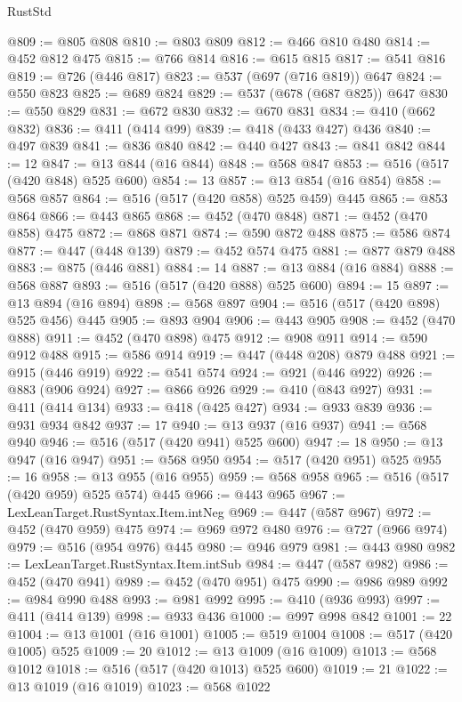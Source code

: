 \begin{lexlean}{RustStd}
\begin{coremodule}
@809 := @805 @808
@810 := @803 @809
@812 := @466 @810 @480
@814 := @452 @812 @475
@815 := @766 @814
@816 := @615 @815
@817 := @541 @816
@819 := @726 (@446 @817)
@823 := @537 (@697 (@716 @819)) @647
@824 := @550 @823
@825 := @689 @824
@829 := @537 (@678 (@687 @825)) @647
@830 := @550 @829
@831 := @672 @830
@832 := @670 @831
@834 := @410 (@662 @832)
@836 := @411 (@414 @99)
@839 := @418 (@433 @427) @436
@840 := @497 @839
@841 := @836 @840
@842 := @440 @427
@843 := @841 @842
@844 := 12
@847 := @13 @844 (@16 @844)
@848 := @568 @847
@853 := @516 (@517 (@420 @848) @525 @600)
@854 := 13
@857 := @13 @854 (@16 @854)
@858 := @568 @857
@864 := @516 (@517 (@420 @858) @525 @459) @445
@865 := @853 @864
@866 := @443 @865
@868 := @452 (@470 @848)
@871 := @452 (@470 @858) @475
@872 := @868 @871
@874 := @590 @872 @488
@875 := @586 @874
@877 := @447 (@448 @139)
@879 := @452 @574 @475
@881 := @877 @879 @488
@883 := @875 (@446 @881)
@884 := 14
@887 := @13 @884 (@16 @884)
@888 := @568 @887
@893 := @516 (@517 (@420 @888) @525 @600)
@894 := 15
@897 := @13 @894 (@16 @894)
@898 := @568 @897
@904 := @516 (@517 (@420 @898) @525 @456) @445
@905 := @893 @904
@906 := @443 @905
@908 := @452 (@470 @888)
@911 := @452 (@470 @898) @475
@912 := @908 @911
@914 := @590 @912 @488
@915 := @586 @914
@919 := @447 (@448 @208) @879 @488
@921 := @915 (@446 @919)
@922 := @541 @574
@924 := @921 (@446 @922)
@926 := @883 (@906 @924)
@927 := @866 @926
@929 := @410 (@843 @927)
@931 := @411 (@414 @134)
@933 := @418 (@425 @427)
@934 := @933 @839
@936 := @931 @934 @842
@937 := 17
@940 := @13 @937 (@16 @937)
@941 := @568 @940
@946 := @516 (@517 (@420 @941) @525 @600)
@947 := 18
@950 := @13 @947 (@16 @947)
@951 := @568 @950
@954 := @517 (@420 @951) @525
@955 := 16
@958 := @13 @955 (@16 @955)
@959 := @568 @958
@965 := @516 (@517 (@420 @959) @525 @574) @445
@966 := @443 @965
@967 := LexLeanTarget.RustSyntax.Item.intNeg
@969 := @447 (@587 @967)
@972 := @452 (@470 @959) @475
@974 := @969 @972 @480
@976 := @727 (@966 @974)
@979 := @516 (@954 @976) @445
@980 := @946 @979
@981 := @443 @980
@982 := LexLeanTarget.RustSyntax.Item.intSub
@984 := @447 (@587 @982)
@986 := @452 (@470 @941)
@989 := @452 (@470 @951) @475
@990 := @986 @989
@992 := @984 @990 @488
@993 := @981 @992
@995 := @410 (@936 @993)
@997 := @411 (@414 @139)
@998 := @933 @436
@1000 := @997 @998 @842
@1001 := 22
@1004 := @13 @1001 (@16 @1001)
@1005 := @519 @1004
@1008 := @517 (@420 @1005) @525
@1009 := 20
@1012 := @13 @1009 (@16 @1009)
@1013 := @568 @1012
@1018 := @516 (@517 (@420 @1013) @525 @600)
@1019 := 21
@1022 := @13 @1019 (@16 @1019)
@1023 := @568 @1022

\end{coremodule}
\end{lexlean}
